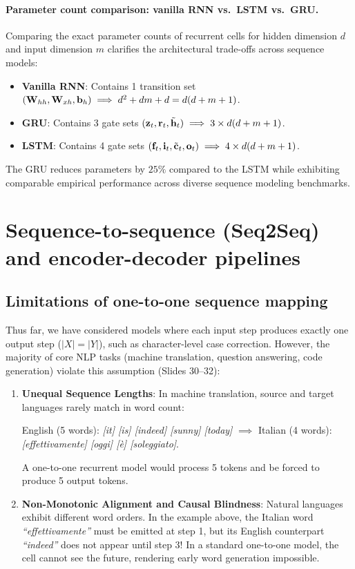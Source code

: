 \documentclass[../../main.tex]{subfiles}
\begin{document}
\paragraph{Parameter count comparison: vanilla RNN vs.~LSTM vs.~GRU.}
Comparing the exact parameter counts of recurrent cells for hidden dimension $d$ and input dimension $m$ clarifies the architectural trade-offs across sequence models:
\begin{itemize}
    \item \textbf{Vanilla RNN}: Contains 1 transition set $(\mathbf{W}_{hh}, \mathbf{W}_{xh}, \mathbf{b}_h) \implies d^2 + dm + d = d(d + m + 1)$.
    \item \textbf{GRU}: Contains 3 gate sets $(\mathbf{z}_t, \mathbf{r}_t, \tilde{\mathbf{h}}_t) \implies 3 \times d(d + m + 1)$.
    \item \textbf{LSTM}: Contains 4 gate sets $(\mathbf{f}_t, \mathbf{i}_t, \tilde{\mathbf{c}}_t, \mathbf{o}_t) \implies 4 \times d(d + m + 1)$.
\end{itemize}
The GRU reduces parameters by $25\%$ compared to the LSTM while exhibiting comparable empirical performance across diverse sequence modeling benchmarks.

\section{Sequence-to-sequence (Seq2Seq) and encoder-decoder pipelines}
\label{sec:seq2seq}

\subsection{Limitations of one-to-one sequence mapping}
Thus far, we have considered models where each input step produces exactly one output step ($|X| = |Y|$), such as character-level case correction. However, the majority of core NLP tasks (machine translation, question answering, code generation) violate this assumption (Slides 30--32):
\begin{enumerate}
    \item \textbf{Unequal Sequence Lengths}: In machine translation, source and target languages rarely match in word count:
    \begin{center}
    English (5 words): \textit{[it] [is] [indeed] [sunny] [today]} $\implies$ Italian (4 words): \textit{[effettivamente] [oggi] [\`e] [soleggiato]}.
    \end{center}
    A one-to-one recurrent model would process 5 tokens and be forced to produce 5 output tokens.
    \item \textbf{Non-Monotonic Alignment and Causal Blindness}: Natural languages exhibit different word orders. In the example above, the Italian word \textit{``effettivamente''} must be emitted at step 1, but its English counterpart \textit{``indeed''} does not appear until step 3! In a standard one-to-one model, the cell cannot see the future, rendering early word generation impossible.
\end{enumerate}
\end{document}
